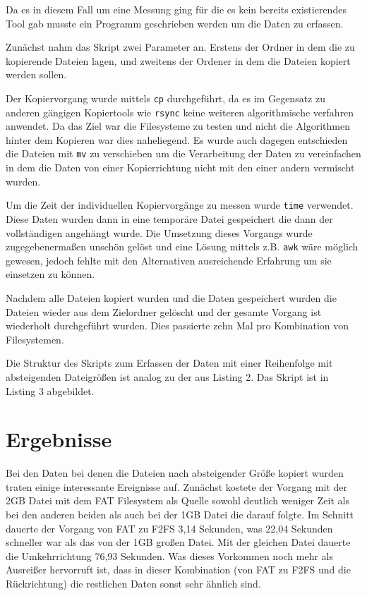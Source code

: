 \documentclass[11pt,parskip=full]{scrartcl}
\begin{document}
	Da es in diesem Fall um eine Messung ging für die es kein bereits existierendes Tool gab musste ein Programm geschrieben werden um die Daten zu erfassen.
	
	Zunächst nahm das Skript zwei Parameter an. Erstens der Ordner in dem die zu kopierende Dateien lagen, und zweitens der Ordener in dem die Dateien kopiert werden sollen.
	
	Der Kopiervorgang wurde mittels \lstinline|cp| durchgeführt, da es im Gegensatz zu anderen gängigen Kopiertools wie \lstinline|rsync| keine weiteren algorithmische verfahren anwendet. Da das Ziel war die Filesysteme zu testen und nicht die Algorithmen hinter dem Kopieren war dies naheliegend. Es wurde auch dagegen entschieden die Dateien mit \lstinline|mv| zu verschieben um die Verarbeitung der Daten zu vereinfachen in dem die Daten von einer Kopierrichtung nicht mit den einer andern vermischt wurden.
	
	Um die Zeit der individuellen Kopiervorgänge zu messen wurde \lstinline|time| verwendet. Diese Daten wurden dann in eine temporäre Datei gespeichert die dann der vollständigen angehängt wurde. Die Umsetzung dieses Vorgangs wurde zugegebenermaßen unschön gelöst und eine Lösung mittels z.B. \lstinline|awk| wäre möglich gewesen, jedoch fehlte mit den Alternativen ausreichende Erfahrung um sie einsetzen zu können.
	
	Nachdem alle Dateien kopiert wurden und die Daten gespeichert wurden die Dateien wieder aus dem Zielordner gelöscht und der gesamte Vorgang ist wiederholt durchgeführt wurden. Dies passierte zehn Mal pro Kombination von Filesystemen.
	
	

	Die Struktur des Skripts zum Erfassen der Daten mit einer Reihenfolge mit absteigenden Dateigrößen ist analog zu der aus Listing 2. Das Skript ist in Listing 3 abgebildet.
	


\section{Ergebnisse}

	Bei den Daten bei denen die Dateien nach absteigender Größe kopiert wurden traten einige interessante Ereignisse auf. Zunächst kostete der Vorgang mit der 2GB Datei mit dem FAT Filesystem als Quelle sowohl deutlich weniger Zeit als bei den anderen beiden als auch bei der 1GB Datei die darauf folgte. Im Schnitt dauerte der Vorgang von FAT zu F2FS 3,14 Sekunden, was 22,04 Sekunden schneller war als das von der 1GB großen Datei. Mit der gleichen Datei dauerte die Umkehrrichtung 76,93 Sekunden. Was dieses Vorkommen noch mehr als Ausreißer hervorruft ist, dass in dieser Kombination (von FAT zu F2FS und die Rückrichtung) die restlichen Daten sonst sehr ähnlich sind.
	
\end{document}

